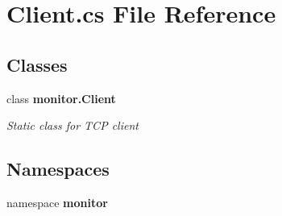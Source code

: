 \section{Client.\+cs File Reference}
\label{_client_8cs}
\subsection*{Classes}
\begin{DoxyCompactItemize}
\item 
class \textbf{ monitor.\+Client}
\begin{DoxyCompactList}\small\item\em Static class for T\+CP client \end{DoxyCompactList}\end{DoxyCompactItemize}
\subsection*{Namespaces}
\begin{DoxyCompactItemize}
\item 
namespace \textbf{ monitor}
\end{DoxyCompactItemize}

